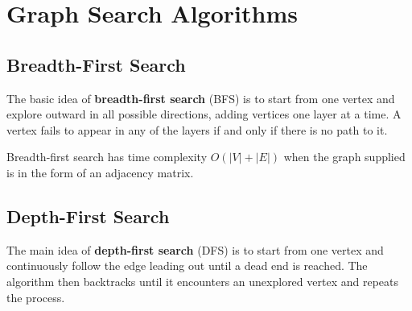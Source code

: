 \documentclass[11pt]{article}
\begin{document}
\section{Graph Search Algorithms}
\subsection{Breadth-First Search}
The basic idea of \textbf{breadth-first search} (BFS) is to start from one vertex and explore outward in all possible directions, adding vertices one layer at a time. A vertex fails to appear in any of the layers if and only if there is no path to it. 

\IncMargin{2em}
\begin{algorithm}[H]
    \footnotesize
    \DontPrintSemicolon
    \BlankLine
\end{algorithm}\DecMargin{2em} 

Breadth-first search has time complexity $O(|V| + |E|)$ when the graph supplied is in the form of an adjacency matrix. 

\subsection{Depth-First Search}
The main idea of \textbf{depth-first search} (DFS) is to start from one vertex and continuously follow the edge leading out until a dead end is reached. The algorithm then backtracks until it encounters an unexplored vertex and repeats the process.
\end{document}
